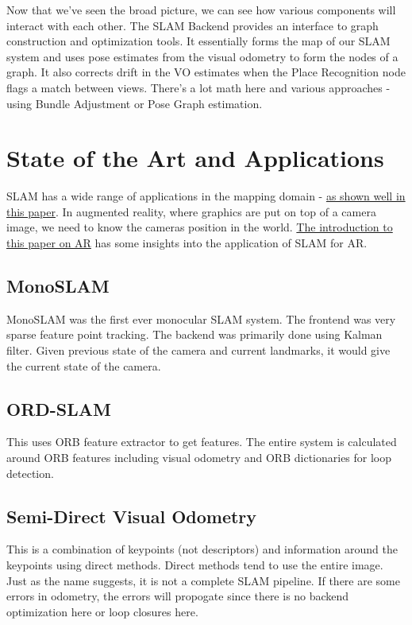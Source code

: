 Now that we've seen the broad picture, we can see how various components will interact with each other. The SLAM Backend provides an interface to graph construction and optimization tools. It essentially forms the map of our SLAM system and uses pose estimates from the visual odometry to form the nodes of a graph. It also corrects drift in the VO estimates when the Place Recognition node flags a match between views. There's a lot math here and various approaches - using Bundle Adjustment or Pose Graph estimation.

\section{State of the Art and Applications}

SLAM has a wide range of applications in the mapping domain - \href{http://www.informatik.uni-bremen.de/agebv2/downloads/published/freseki10.pdf}{as shown well in this paper}. In augmented reality, where graphics are put on top of a camera image, we need to know the cameras position in the world. \href{https://sci-hub.tw/10.1109/ISMAR.2007.4538852}{The introduction to this paper on AR} has some insights into the application of SLAM for AR.

\subsection*{MonoSLAM}

MonoSLAM was the first ever monocular SLAM system. The frontend was very sparse feature point tracking. The backend was primarily done using Kalman filter. Given previous state of the camera and current landmarks, it would give the current state of the camera. 

\subsection*{ORD-SLAM}

This uses ORB feature extractor to get features. The entire system is calculated around ORB features including visual odometry and ORB dictionaries for loop detection.

\subsection*{Semi-Direct Visual Odometry}

This is a combination of keypoints (not descriptors) and information around the keypoints using direct methods. Direct methods tend to use the entire image. Just as the name suggests, it is not a complete SLAM pipeline. If there are some errors in odometry, the errors will propogate since there is no backend optimization here or loop closures here.

